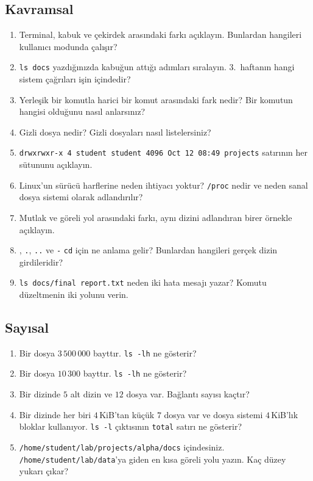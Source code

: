 \documentclass[11pt,a4paper]{article}
\newcommand{\cmd}[1]{\texttt{#1}}
\begin{document}
\subsection*{Kavramsal}
\begin{enumerate}[leftmargin=1.6em]
  \item Terminal, kabuk ve çekirdek arasındaki farkı açıklayın. Bunlardan hangileri kullanıcı modunda çalışır?
  \item \cmd{ls docs} yazdığınızda kabuğun attığı adımları sıralayın. 3.\ haftanın hangi sistem çağrıları işin içindedir?
  \item Yerleşik bir komutla harici bir komut arasındaki fark nedir? Bir komutun hangisi olduğunu nasıl anlarsınız?
  \item Gizli dosya nedir? Gizli dosyaları nasıl listelersiniz?
  \item \texttt{drwxrwxr-x 4 student student 4096 Oct 12 08:49 projects} satırının her sütununu açıklayın.
  \item Linux'un sürücü harflerine neden ihtiyacı yoktur? \texttt{/proc} nedir ve neden sanal dosya sistemi olarak adlandırılır?
  \item Mutlak ve göreli yol arasındaki farkı, aynı dizini adlandıran birer örnekle açıklayın.
  \item \texttt{\tl}, \texttt{.}, \texttt{..} ve \texttt{-} \cmd{cd} için ne anlama gelir? Bunlardan hangileri gerçek dizin girdileridir?
  \item \cmd{ls docs/final report.txt} neden iki hata mesajı yazar? Komutu düzeltmenin iki yolunu verin.
\end{enumerate}

\subsection*{Sayısal}
\begin{enumerate}[leftmargin=1.6em,resume]
  \item Bir dosya $3\,500\,000$ bayttır. \cmd{ls -lh} ne gösterir?
  \item Bir dosya $10\,300$ bayttır. \cmd{ls -lh} ne gösterir?
  \item Bir dizinde $5$ alt dizin ve $12$ dosya var. Bağlantı sayısı kaçtır?
  \item Bir dizinde her biri $4$\,KiB'tan küçük $7$ dosya var ve dosya sistemi $4$\,KiB'lık bloklar kullanıyor. \cmd{ls -l} çıktısının \texttt{total} satırı ne gösterir?
  \item \texttt{/home/student/lab/projects/alpha/docs} içindesiniz. \texttt{/home/student/lab/data}'ya giden en kısa göreli yolu yazın. Kaç düzey yukarı çıkar?
\end{enumerate}
\end{document}
